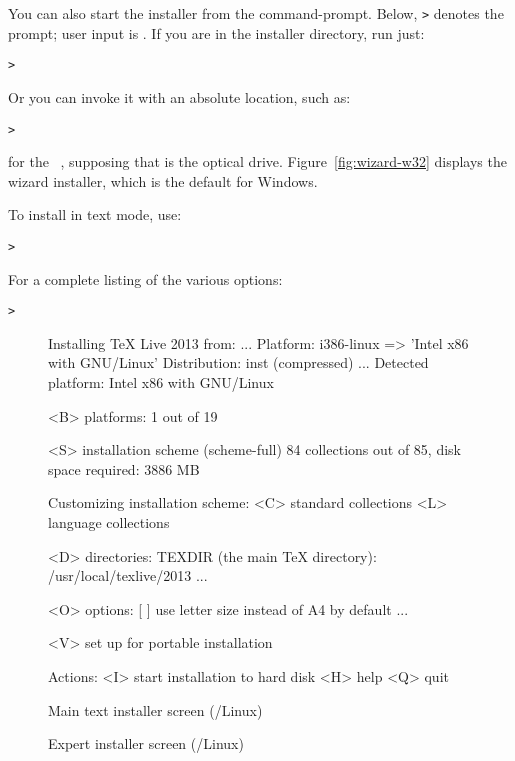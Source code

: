 \documentclass{article}
\begin{document}
You can also start the installer from the command-prompt.  Below,
\texttt{>} denotes the prompt; user input is .  If
you are in the installer directory, run just:
\begin{alltt}
> 
\end{alltt}

Or you can invoke it with an absolute location, such as:
\begin{alltt}
> 
\end{alltt}
for the \TK\ \DVD, supposing that  is the optical
drive. Figure~\ref{fig:wizard-w32} displays the wizard installer, which
is the default for Windows.

To install in text mode, use:
\begin{alltt}
> 
\end{alltt}

For a complete listing of the various options:
\begin{alltt}
> 
\end{alltt}

\begin{figure}[tb]
\begin{boxedverbatim}
Installing TeX Live 2013 from: ...
Platform: i386-linux => 'Intel x86 with GNU/Linux'
Distribution: inst (compressed)
...
 Detected platform: Intel x86 with GNU/Linux

 <B> platforms: 1 out of 19

 <S> installation scheme (scheme-full)
     84 collections out of 85, disk space required: 3886 MB

 Customizing installation scheme:
   <C> standard collections
   <L> language collections

 <D> directories:
   TEXDIR (the main TeX directory):
     /usr/local/texlive/2013
   ...

 <O> options:
   [ ] use letter size instead of A4 by default
   ...
 
 <V> set up for portable installation

Actions:
 <I> start installation to hard disk
 <H> help
 <Q> quit
\end{boxedverbatim}
\caption{Main text installer screen (\GNU/Linux)}\label{fig:text-main}
\end{figure}

\begin{figure}[tb]
\caption{Expert \GUI{} installer screen (\GNU/Linux)}\label{fig:gui-main}
\end{figure}
\end{document}
